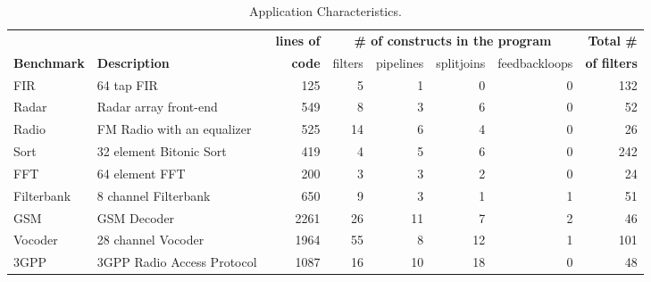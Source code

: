 \begin{table}[t]
\caption{Application Characteristics.}
\label{tab:benchmarks}
\centering
\footnotesize %
\begin{tabular}{l|l||r||r|r|r|r||r} \hline
 & & {\bf lines of} & \multicolumn{4}{|c||}{\bf \# of constructs in
   the program} & {\bf Total \#} \\ \cline{4-7}
{\bf Benchmark} & {\bf Description} & {\bf code} & filters & pipelines
& splitjoins & feedbackloops & {\bf of filters}
\\
\hline \hline
FIR & 64 tap FIR & 
125 & 5 & 1 & 0 & 0 & 132
\\ \hline
Radar & Radar array front-end\cite{pca} & 
549 & 8 & 3 & 6 & 0 & 52
\\ \hline
Radio & FM Radio with an equalizer & 
525 & 14 & 6 & 4 & 0 & 26
\\ \hline
Sort & 32 element Bitonic Sort & 
419 & 4 & 5 & 6 & 0 & 242
\\  \hline
FFT & 64 element FFT & 
200 & 3 & 3 & 2 & 0 & 24
\\  \hline
Filterbank & 8 channel Filterbank & 
650 & 9 & 3 & 1 & 1 & 51
\\  \hline
GSM & GSM Decoder & 
2261 & 26 & 11 & 7 & 2 & 46
\\ \hline
Vocoder & 28 channel Vocoder~\cite{seneff80}&  
1964 & 55 & 8 & 12 & 1 & 101
\\ \hline
3GPP & 3GPP Radio Access Protocol~\cite{3gpp} &  
1087 & 16 & 10 & 18 & 0 & 48
\\ \hline
\end{tabular}
\end{table}


